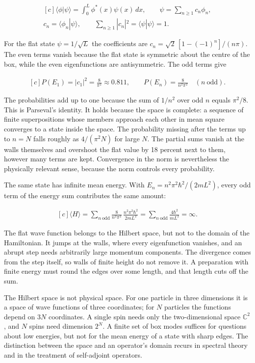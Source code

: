 \documentclass[11pt,oneside]{book}
\newenvironment{centeredalign}{\[\begin{gathered}[c]}{\end{gathered}\]}
\begin{document}
\begin{centeredalign}
\langle\phi|\psi\rangle=\int_0^L\phi^*(x)\psi(x)\,dx,\qquad
\psi=\sum_{n\geq1}c_n\phi_n,\\
c_n=\langle\phi_n|\psi\rangle,\qquad
\sum_{n\geq1}|c_n|^2=\langle\psi|\psi\rangle=1.
\end{centeredalign}

For the flat state \(\psi=1/\sqrt L\) the coefficients are \(c_n=\sqrt2\,[1-(-1)^n]/(n\pi)\). The even terms vanish because the flat state is symmetric about the centre of the box, while the even eigenfunctions are antisymmetric. The odd terms give

\begin{centeredalign}
P(E_1)=|c_1|^2=\frac{8}{\pi^2}\approx0.811,\qquad
P(E_n)=\frac{8}{n^2\pi^2}\quad(n\ \text{odd}).
\end{centeredalign}

The probabilities add up to one because the sum of \(1/n^2\) over odd \(n\) equals \(\pi^2/8\). This is Parseval's identity. It holds because the space is complete: a sequence of finite superpositions whose members approach each other in mean square converges to a state inside the space. The probability missing after the terms up to \(n=N\) falls roughly as \(4/(\pi^2N)\) for large \(N\). The partial sums vanish at the walls themselves and overshoot the flat value by 18 percent next to them, however many terms are kept. Convergence in the norm is nevertheless the physically relevant sense, because the norm controls every probability.

The same state has infinite mean energy. With \(E_n=n^2\pi^2\hbar^2/(2mL^2)\), every odd term of the energy sum contributes the same amount:

\begin{centeredalign}
\langle H\rangle=\sum_{n\ \text{odd}}\frac{8}{n^2\pi^2}\,
\frac{n^2\pi^2\hbar^2}{2mL^2}
=\sum_{n\ \text{odd}}\frac{4\hbar^2}{mL^2}=\infty.
\end{centeredalign}

The flat wave function belongs to the Hilbert space, but not to the domain of the Hamiltonian. It jumps at the walls, where every eigenfunction vanishes, and an abrupt step needs arbitrarily large momentum components. The divergence comes from the step itself, so walls of finite height do not remove it. A preparation with finite energy must round the edges over some length, and that length cuts off the sum.

The Hilbert space is not physical space. For one particle in three dimensions it is a space of wave functions of three coordinates; for \(N\) particles the functions depend on \(3N\) coordinates. A single spin needs only the two-dimensional space \(\mathbb C^2\), and \(N\) spins need dimension \(2^N\). A finite set of box modes suffices for questions about low energies, but not for the mean energy of a state with sharp edges. The distinction between the space and an operator's domain recurs in spectral theory and in the treatment of self-adjoint operators.
\end{document}
